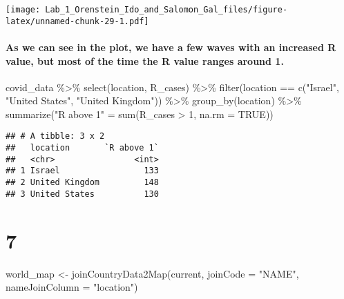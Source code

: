 \documentclass[
]{article}
\newenvironment{Shaded}{\begin{snugshade}}{\end{snugshade}}
\newcommand{\AttributeTok}[1]{\textcolor[rgb]{0.77,0.63,0.00}{#1}}
\newcommand{\ConstantTok}[1]{\textcolor[rgb]{0.00,0.00,0.00}{#1}}
\newcommand{\DecValTok}[1]{\textcolor[rgb]{0.00,0.00,0.81}{#1}}
\newcommand{\FunctionTok}[1]{\textcolor[rgb]{0.00,0.00,0.00}{#1}}
\newcommand{\NormalTok}[1]{#1}
\newcommand{\OtherTok}[1]{\textcolor[rgb]{0.56,0.35,0.01}{#1}}
\newcommand{\SpecialCharTok}[1]{\textcolor[rgb]{0.00,0.00,0.00}{#1}}
\newcommand{\StringTok}[1]{\textcolor[rgb]{0.31,0.60,0.02}{#1}}
\begin{document}
\texttt{[image: Lab\_1\_Orenstein\_Ido\_and\_Salomon\_Gal\_files/figure-latex/unnamed-chunk-29-1.pdf]}

\hypertarget{as-we-can-see-in-the-plot-we-have-a-few-waves-with-an-increased-r-value-but-most-of-the-time-the-r-value-ranges-around-1.}{%
\paragraph{As we can see in the plot, we have a few waves with an
increased R value, but most of the time the R value ranges around
1.}\label{as-we-can-see-in-the-plot-we-have-a-few-waves-with-an-increased-r-value-but-most-of-the-time-the-r-value-ranges-around-1.}}

\begin{Shaded}
\begin{Highlighting}[]
\NormalTok{covid\_data }\SpecialCharTok{\%\textgreater{}\%} \FunctionTok{select}\NormalTok{(location, R\_cases) }\SpecialCharTok{\%\textgreater{}\%} \FunctionTok{filter}\NormalTok{(location }\SpecialCharTok{==} \FunctionTok{c}\NormalTok{(}\StringTok{"Israel"}\NormalTok{, }\StringTok{"United States"}\NormalTok{, }\StringTok{"United Kingdom"}\NormalTok{)) }\SpecialCharTok{\%\textgreater{}\%} \FunctionTok{group\_by}\NormalTok{(location) }\SpecialCharTok{\%\textgreater{}\%} \FunctionTok{summarize}\NormalTok{(}\StringTok{"R above 1"} \OtherTok{=} \FunctionTok{sum}\NormalTok{(R\_cases }\SpecialCharTok{\textgreater{}} \DecValTok{1}\NormalTok{, }\AttributeTok{na.rm =} \ConstantTok{TRUE}\NormalTok{))}
\end{Highlighting}
\end{Shaded}

\begin{verbatim}
## # A tibble: 3 x 2
##   location       `R above 1`
##   <chr>                <int>
## 1 Israel                 133
## 2 United Kingdom         148
## 3 United States          130
\end{verbatim}

\hypertarget{section-6}{%
\section{7}\label{section-6}}

\begin{Shaded}
\begin{Highlighting}[]
\NormalTok{world\_map }\OtherTok{\textless{}{-}} \FunctionTok{joinCountryData2Map}\NormalTok{(current, }\AttributeTok{joinCode =} \StringTok{"NAME"}\NormalTok{, }\AttributeTok{nameJoinColumn =} \StringTok{"location"}\NormalTok{)}
\end{Highlighting}
\end{Shaded}
\end{document}
